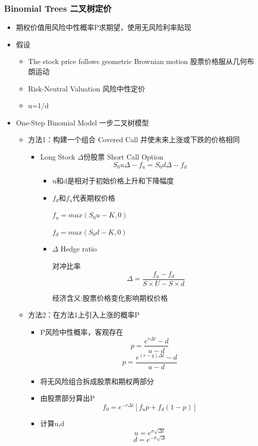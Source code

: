 \documentclass[a4paper,6pt,twoside,openany]{article}
\begin{document}
\subsubsection{Binomial Trees 二叉树定价}
\begin{itemize}
\item 期权价值用风险中性概率P求期望，使用无风险利率贴现
\item 假设
  \begin{itemize}
  \item The stock price follows geometric Brownian motion 股票价格服从几何布朗运动
  \item Risk-Neutral Valuation 风险中性定价
  \item u=1/d
  \end{itemize}
    
\item One-Step Binomial Model 一步二叉树模型
  \begin{itemize}
  \item 方法1：构建一个组合 Covered Call 并使未来上涨或下跌的价格相同
    \begin{itemize}
    \item Long Stock $\Delta$份股票 Short Call Option
      $$S_{0}u\Delta - f_{u} = S_{0}d\Delta - f_{d}$$
      \begin{itemize}
      \item u和d是相对于初始价格上升和下降幅度
      \item $f_{d}和f_{u}$代表期权价格
        \par $f_{u} = max(S_{0}u - K,0)$
        \par $f_{d} = max(S_{0}d - K ,0)$
      \item $\Delta$ Hedge ratio
        \par 对冲比率 $$\Delta = \frac{f_{u} - f_{d}}{S \times U - S \times d}$$
        \par 经济含义:股票价格变化影响期权价格
      \end{itemize}
    \end{itemize}
  \item 方法2：在方法1上引入上涨的概率P
    \begin{itemize}
    \item P风险中性概率，客观存在 $$p=\frac{e^{r\Delta t} - d}{u -
        d}$$ $$p=\frac{e^{(r-q)\Delta t} - d}{u - d}$$
    \item 将无风险组合拆成股票和期权两部分
    \item 由股票部分算出P $$f_{0}=e^{-r\Delta t}[f_{u}p + f_{d}(1-p)]$$
    \item 计算u,d $$u=e^{\sigma \sqrt{\Delta t}}$$$$d=e^{-\sigma \sqrt{\Delta
}}$$
\end{itemize}
\end{itemize}
\end{itemize}
\end{document}
